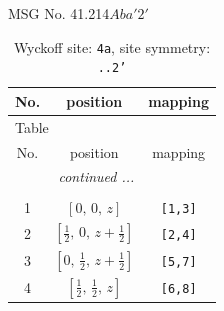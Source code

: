 \documentclass[fleqn,8pt]{jsarticle}
\begin{document}
\setcounter{MaxMatrixCols}{32}

\renewcommand{\tablename}{Table~}
\renewcommand{\figurename}{Figure~}
\begin{center}
\LARGE
MSG No. 41.214\quad$Aba'2'$
\end{center}
\renewcommand{\arraystretch}{1.2}
\begin{longtable}{ccc}
\caption{Wyckoff site: {\tt 4a}, site symmetry: {\tt ..2'}}
 \\
 \hline \hline
No. & position & mapping \\ \hline \endfirsthead

\multicolumn{2}{l}{\tablename\ \thetable{}} \\
 \hline \hline
No. & position & mapping \\ \hline \endhead

 \hline \hline
\multicolumn{2}{r}{\footnotesize\it continued ...} \\ \endfoot

 \hline \hline
\multicolumn{2}{r}{} \\ \endlastfoot

1 & $\left[ 0,\, 0,\, z \right]$ & {\tt [1,3]} \\ \hline
2 & $\left[ \frac{1}{2},\, 0,\, z + \frac{1}{2} \right]$ & {\tt [2,4]} \\ \hline
3 & $\left[ 0,\, \frac{1}{2},\, z + \frac{1}{2} \right]$ & {\tt [5,7]} \\ \hline
4 & $\left[ \frac{1}{2},\, \frac{1}{2},\, z \right]$ & {\tt [6,8]} \\
\end{longtable}
\renewcommand{\arraystretch}{1.2}
\end{document}
